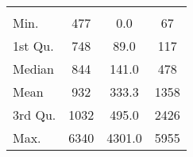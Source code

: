 \begin{tabular}{lS[table-format=5.1]S[table-format=5.1]S[table-format=5.1]}
&  &  &  \\
 Min.    & 477 & 0.0 & 67 \\
 1st Qu. & 748 & 89.0 & 117 \\
 Median  & 844 & 141.0 & 478 \\
 Mean    & 932 & 333.3 & 1358 \\
 3rd Qu. & 1032 & 495.0 & 2426 \\
 Max.    & 6340 & 4301.0 & 5955 \\
\end{tabular}

